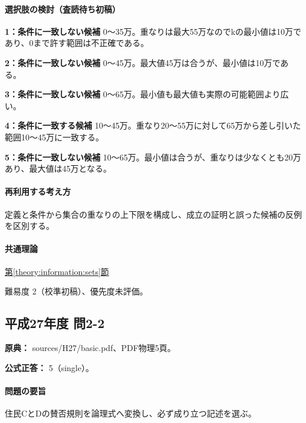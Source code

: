 \paragraph{選択肢の検討（査読待ち初稿）}\mbox{}\par

\noindent\textbf{1：条件に一致しない候補} 0〜35万。重なりは最大55万なのでkの最小値は10万であり、0まで許す範囲は不正確である。\par

\noindent\textbf{2：条件に一致しない候補} 0〜45万。最大値45万は合うが、最小値は10万である。\par

\noindent\textbf{3：条件に一致しない候補} 0〜65万。最小値も最大値も実際の可能範囲より広い。\par

\noindent\textbf{4：条件に一致する候補} 10〜45万。重なり20〜55万に対して65万から差し引いた範囲10〜45万に一致する。\par

\noindent\textbf{5：条件に一致しない候補} 10〜65万。最小値は合うが、重なりは少なくとも20万あり、最大値は45万となる。\par

\paragraph{再利用する考え方} 定義と条件から集合の重なりの上下限を構成し、成立の証明と誤った候補の反例を区別する。

\paragraph{共通理論} \hyperref[theory:information:sets]{第\ref*{theory:information:sets}節}

\par 難易度 2（校準初稿）、優先度未評価。

\subsection{平成27年度 問2-2}
\label{q:h27-reg-basic-2-2}

\noindent\textbf{原典：} sources/H27/basic.pdf、PDF物理5頁。

\textbf{公式正答：} 5（single）。

\paragraph{問題の要旨} 住民CとDの賛否規則を論理式へ変換し、必ず成り立つ記述を選ぶ。

